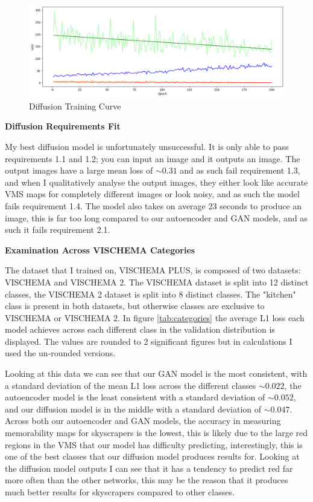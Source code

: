\documentclass{UoYCSproject}
\begin{document}
\begin{figure}[ht]
    \centering
    \includegraphics[width=\linewidth]{GAN training curve}
    \caption{Diffusion Training Curve}
    \label{fig:DiffusionTraining}
\end{figure}

\textbf{Diffusion Requirements Fit}

My best diffusion model is unfortunately unsuccessful. It is only able to pass requirements 1.1 and 1.2; you can input an image and it outputs an image. The output images have a large mean loss of \( \sim 0.31 \) and as such fail requirement 1.3, and when I qualitatively analyse the output images, they either look like accurate VMS maps for completely different images or look noisy, and as such the model fails requirement 1.4. The model also takes on average 23 seconds to produce an image, this is far too long compared to our autoencoder and GAN models, and as such it fails requirement 2.1. 

\textbf{Examination Across VISCHEMA Categories}

The dataset that I trained on, VISCHEMA PLUS, is composed of two datasets: VISCHEMA and VISCHEMA 2. The VISCHEMA dataset is split into 12 distinct classes, the VISCHEMA 2 dataset is split into 8 distinct classes. The "kitchen" class is present in both datasets, but otherwise classes are exclusive to VISCHEMA or VISCHEMA 2. In figure \ref{tab:categories} the average L1 loss each model achieves across each different class in the validation distribution is displayed. The values are rounded to 2 significant figures but in calculations I used the un-rounded versions. 

Looking at this data we can see that our GAN model is the most consistent, with a standard deviation of the mean L1 loss across the different classes \( \sim 0.022\), the autoencoder model is the least consistent with a standard deviation of \( \sim 0.052\), and our diffusion model is in the middle with a standard deviation of \( \sim 0.047\). Across both our autoencoder and GAN models, the accuracy in measuring memorability maps for skyscrapers is the lowest, this is likely due to the large red regions in the VMS that our model has difficulty predicting, interestingly, this is one of the best classes that our diffusion model produces results for. Looking at the diffusion model outputs I can see that it has a tendency to predict red far more often than the other networks, this may be the reason that it produces much better results for skyscrapers compared to other classes.
\end{document}
